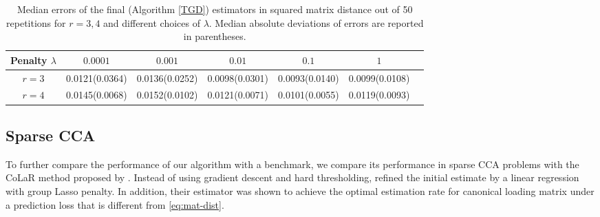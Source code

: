 \documentclass[11pt]{article}
\newcommand{\0}{{\mathbf{0}}}
\begin{document}
\begin{table}[!tb]
\centering
\begin{tabular}{c|cccccc}
\hline
\multicolumn{1}{c|}{Penalty $\lambda$} & $0.0001$ & $0.001$ & $0.01$ & $0.1$ & $1$  \\ 
\hline
$r=3$ & 0.0121(0.0364) & 0.0136(0.0252) & 0.0098(0.0301) & 0.0093(0.0140)  & 0.0099(0.0108) \\ \cline{1-1}
$r=4$ & 0.0145(0.0068) & 0.0152(0.0102) & 0.0121(0.0071) & 0.0101(0.0055) & 0.0119(0.0093) & \\ \hline
\end{tabular}
\caption{Median errors of the final (Algorithm \ref{TGD}) estimators in squared matrix distance out of 50 repetitions for $r= 3, 4$ and different choices of  $\lambda$. 
Median absolute deviations of errors are reported in parentheses. }
\label{table:tune_lambda}
\end{table}


\subsection{Sparse CCA}


To further compare the performance of our algorithm with a benchmark, we compare its performance in sparse CCA problems with the CoLaR method proposed by \cite{gao2017sparse}. 
Instead of using gradient descent and hard thresholding, \citet{gao2017sparse} refined the initial estimate by a linear regression with group Lasso penalty. In addition, their estimator was shown to achieve the optimal estimation rate for canonical loading matrix under a prediction loss that is different from \eqref{eq:mat-dist}.
\end{document}
